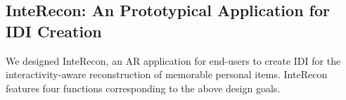 

\subsection{InteRecon: An Prototypical Application for IDI Creation}
\label{design_interRecon}
We designed InteRecon, an AR application for end-users to create IDI for the interactivity-aware reconstruction of memorable personal items. InteRecon features four functions corresponding to the above design goals.

